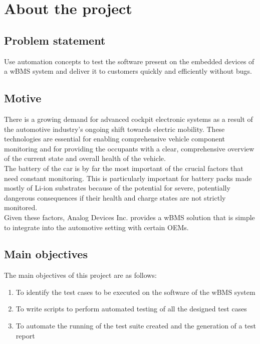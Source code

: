 \chapter{About the project} %

\label{ch:about}


\section{Problem statement}
Use automation concepts to test the software present on the embedded devices of a wBMS system and deliver it to customers quickly and efficiently without bugs.

\section{Motive}
There is a growing demand for advanced cockpit electronic systems as a result of the automotive industry's ongoing shift towards electric mobility. These technologies are essential for enabling comprehensive vehicle component monitoring and for providing the occupants with a clear, comprehensive overview of the current state and overall health of the vehicle. \\
The battery of the car is by far the most important of the crucial factors that need constant monitoring. This is particularly important for battery packs made mostly of Li-ion substrates because of the potential for severe, potentially dangerous consequences if their health and charge states are not strictly monitored. \\
Given these factors, Analog Devices Inc. provides a wBMS solution that is simple to integrate into the automotive setting with certain OEMs.
\newpage
\section{Main objectives}
The main objectives of this project are as follows:
\begin{enumerate}
    \item To identify the test cases to be executed on the software of the wBMS system
    \item To write scripts to perform automated testing of all the designed test cases
    \item To automate the running of the test suite created and the generation of a test report
\end{enumerate}